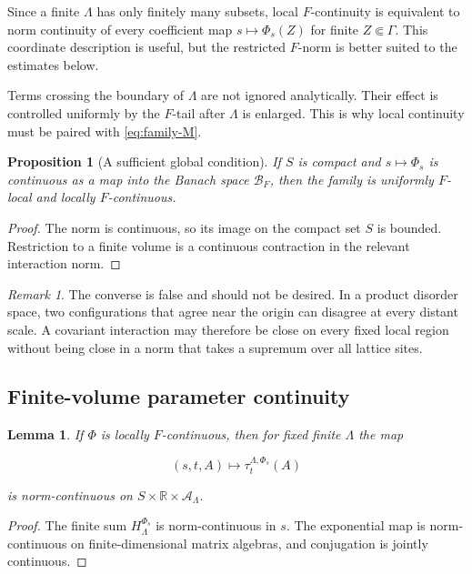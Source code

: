 \documentclass[12pt]{article}
\newtheorem{proposition}[theorem]{Proposition}
\newtheorem{lemma}[theorem]{Lemma}
\theoremstyle{definition}
\theoremstyle{remark}
\newtheorem{remark}[theorem]{Remark}
\newcommand{\Alg}{\mathcal A}
\begin{document}
Since a finite $\Lambda$ has only finitely many subsets, local $F$-continuity
is equivalent to norm continuity of every coefficient map
$s\mapsto\Phi_s(Z)$ for finite $Z\Subset\Gamma$.  This coordinate
description is useful, but the restricted $F$-norm is better suited to the
estimates below.

Terms crossing the boundary of $\Lambda$ are not ignored analytically.  Their
effect is controlled uniformly by the $F$-tail after $\Lambda$ is enlarged.
This is why local continuity must be paired with
\cref{eq:family-M}.

\begin{proposition}[A sufficient global condition]
If $S$ is compact and $s\mapsto\Phi_s$ is continuous as a map into the
Banach space $\mathcal B_F$, then the family is uniformly $F$-local and
locally $F$-continuous.
\end{proposition}

\begin{proof}
The norm is continuous, so its image on the compact set $S$ is bounded.
Restriction to a finite volume is a continuous contraction in the relevant
interaction norm.
\end{proof}

\begin{remark}
The converse is false and should not be desired.  In a product disorder
space, two configurations that agree near the origin can disagree at every
distant scale.  A covariant interaction may therefore be close on every
fixed local region without being close in a norm that takes a supremum over
all lattice sites.
\end{remark}

\subsection{Finite-volume parameter continuity}

\begin{lemma}
If $\Phi$ is locally $F$-continuous, then for fixed finite $\Lambda$ the map

\begin{equation}
  (s,t,A)\longmapsto\tau_t^{\Lambda,\Phi_s}(A)
\end{equation}

is norm-continuous on $S\times\mathbb R\times\Alg_\Lambda$.
\end{lemma}

\begin{proof}
The finite sum $H_\Lambda^{\Phi_s}$ is norm-continuous in $s$.  The
exponential map is norm-continuous on finite-dimensional matrix algebras, and
conjugation is jointly continuous.
\end{proof}
\end{document}

